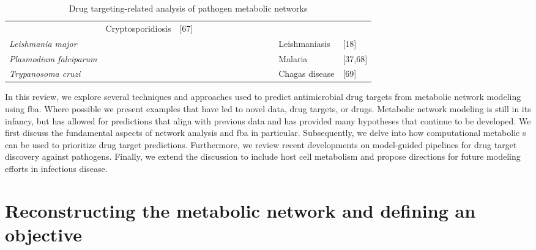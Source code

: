 \begin{sidewaystable}
\begin{tabular}{ l  c  c  c  c  c  c  c  c | c  c | c l l }
     & Cryptosporidiosis & [67] \\ \cline{2-12}
\textit{Leishmania major} & 
     \cellcolor[gray]{0.8} & \cellcolor[gray]{0.8} & & \cellcolor[gray]{0.8} & 
     & \cellcolor[gray]{0.8} & & & \cellcolor[gray]{0.8} & & 
     & Leishmaniasis & [18] \\ \cline{2-12}
\textit{Plasmodium falciparum} & 
     \cellcolor[gray]{0.8} & & & \cellcolor[gray]{0.8} & 
     & & & & \cellcolor[gray]{0.8} & \cellcolor[gray]{0.8} & \cellcolor[gray]{0.8}
     & Malaria & [37,68] \\ \cline{2-12}
\textit{Trypanosoma cruzi} & 
     \cellcolor[gray]{0.8} & & & & \cellcolor[gray]{0.8}
     & & & & \cellcolor[gray]{0.8} & &
     & Chagas disease & [69] \\ %
\end{tabular}
\label{trends:table1}
\caption[Drug targeting-related analysis of pathogen metabolic networks]{
          Drug targeting-related analysis of pathogen metabolic networks}
\end{sidewaystable}

In this review, we explore several techniques and approaches 
used to predict antimicrobial drug targets from metabolic network 
modeling using \gls{fba}. Where possible we present examples that have 
led to novel data, drug targets, or drugs. Metabolic network 
modeling is still in its infancy, but has allowed for predictions 
that align with previous data and has provided many hypotheses 
that continue to be developed. We first discuss the fundamental 
aspects of network analysis and \gls{fba} in particular. Subsequently, 
we delve into how computational metabolic s can be 
used to prioritize drug target predictions. Furthermore, we 
review recent developments on model-guided pipelines for drug 
target discovery against pathogens. Finally, we extend the discussion 
to include host cell metabolism and propose directions for future 
modeling efforts in infectious disease.

\section{Reconstructing the metabolic network and defining an objective}

